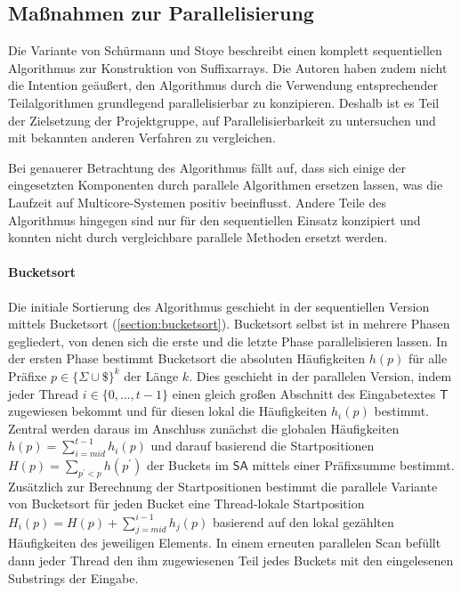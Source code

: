 \subsection{Maßnahmen zur Parallelisierung}
\label{bpr:parallelisierung}
\newcommand{\ltr}[1]{\ensuremath{ltr(\mathsf{b}_{#1})}\xspace}
\newcommand{\rtl}[1]{\ensuremath{rtl(\mathsf{b}_{#1})}\xspace}

Die \bpr Variante von Schürmann und Stoye \cite{saca:2} beschreibt einen komplett sequentiellen Algorithmus zur Konstruktion von {Suf\-fix\-arrays}.
Die Autoren haben zudem nicht die Intention geäußert, den Algorithmus durch die Verwendung entsprechender Teilalgorithmen grundlegend parallelisierbar zu konzipieren.
Deshalb ist es Teil der Zielsetzung der Projektgruppe, \bpr auf Parallelisierbarkeit zu untersuchen und mit bekannten anderen Verfahren zu vergleichen.\par\smallskip
Bei genauerer Betrachtung des Algorithmus fällt auf, dass sich einige der eingesetzten Komponenten durch parallele Algorithmen ersetzen lassen, was die Laufzeit auf Multicore-Systemen positiv beeinflusst.
Andere Teile des Algorithmus hingegen sind nur für den sequentiellen Einsatz konzipiert und konnten nicht durch vergleichbare parallele Methoden ersetzt werden.

\paragraph{Bucketsort}
Die initiale Sortierung des \bpr Algorithmus geschieht in der sequentiellen Version mittels Bucketsort (\cref{section:bucketsort}).
Bucketsort selbst ist in mehrere Phasen gegliedert, von denen sich die erste und die letzte Phase parallelisieren lassen.
In der ersten Phase bestimmt Bucketsort die absoluten Häufigkeiten \(h(p)\) für alle Präfixe \(p \in \{\Sigma \cup \$\}^k\) der Länge \(k\).
Dies geschieht in der parallelen Version, indem jeder Thread \(i \in \{0, \ldots, t-1\}\) einen gleich großen Abschnitt des Eingabetextes \(\mathsf{T}\) zugewiesen bekommt und für diesen lokal die Häufigkeiten \(h_i(p)\) bestimmt.
Zentral werden daraus im Anschluss zunächst die globalen Häufigkeiten \(h(p) = \sum_{i=mid}^{t-1} h_i(p)\) und darauf basierend die Startpositionen \(H(p) = \sum_{p^\prime < p} h(p^\prime)\) der Buckets im \(\mathsf{SA}\) mittels einer Präfixsumme bestimmt.
Zusätzlich zur Berechnung der Startpositionen bestimmt die parallele Variante von Bucketsort für jeden Bucket eine Thread-lokale Startposition \(H_i(p) = H(p) + \sum_{j=mid}^{i-1} h_j(p)\) basierend auf den lokal gezählten Häufigkeiten des jeweiligen Elements.
In einem erneuten parallelen Scan befüllt dann jeder Thread den ihm zugewiesenen Teil jedes Buckets mit den eingelesenen Substrings der Eingabe.

